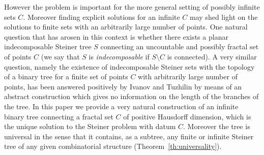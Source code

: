 \documentclass{amsart}
\theoremstyle{definition}
\theoremstyle{remark}
\begin{document}
However the problem is important for the more general setting of possibly infinite 
sets $C$. 
Moreover finding explicit solutions for an infinite $C$ may shed light on 
the solutions to finite sets with an arbitrarily large number of points.
One natural question that has arosen in this context is 
whether there exists a planar indecomposable Steiner tree $S$ connecting an uncountable 
and possibly fractal set of points $C$ 
(we say that $S$ is \emph{indecomposable} if $S\setminus C$ is 
connected).
A very similar question,
namely the existence of indecomposable Steiner sets with the topology 
of a binary tree for a finite set of points $C$ with arbitrarily 
large number of points, has been answered positively by Ivanov and 
Tuzhilin \cite{IvaTuz94} by means of an abstract construction
which gives no information on the length of the branches of the tree.
In this paper we provide a very natural construction of an infinite 
binary tree connecting a fractal set $C$ of positive
Hausdorff dimension, which is the unique solution to the Steiner problem
with datum $C$.
Moreover the tree is universal in the sense that it contains, as a subtree,
any finite or infinite Steiner tree of any given combinatorial structure
(Theorem~\ref{th:universality}).
\end{document}
